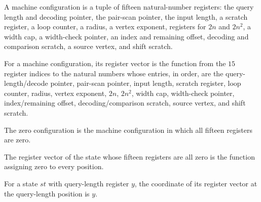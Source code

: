 \begin{definition}
\label{Complexity.PathHard.St}
\leanok
A machine configuration is a tuple of fifteen natural-number registers: the query length
and decoding pointer, the pair-scan pointer, the input length, a scratch register, a
loop counter, a radius, a vertex exponent, registers for $2n$ and $2n^2$, a width cap, a
width-check pointer, an index and remaining offset, decoding and comparison scratch, a
source vertex, and shift scratch.
\end{definition}

\begin{definition}
\label{Complexity.PathHard.St.toV}
\leanok
{}
For a machine configuration, its register vector is the function from the $15$ register
indices to the natural numbers whose entries, in order, are the query-length/decode
pointer, pair-scan pointer, input length, scratch register, loop counter, radius, vertex
exponent, $2n$, $2n^2$, width cap, width-check pointer, index/remaining offset,
decoding/comparison scratch, source vertex, and shift scratch.
\end{definition}

\begin{definition}
\label{Complexity.PathHard.St.zero}
\leanok
{}
The zero configuration is the machine configuration in which all fifteen registers are
zero.
\end{definition}

\begin{lemma}
\label{Complexity.PathHard.St.toV_zero}
\leanok
{}
The register vector of the state whose fifteen registers are all zero is the function
assigning zero to every position.
\end{lemma}

\begin{lemma}
\label{Complexity.PathHard.St.toV_y}
\leanok
{}
For a state $st$ with query-length register $y$, the coordinate of its register vector
at the query-length position is $y$.
\end{lemma}

